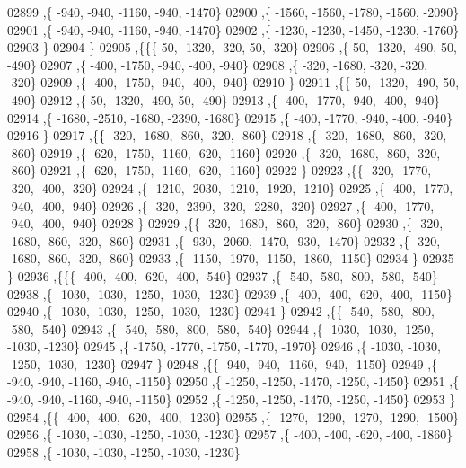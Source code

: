 \begin{DoxyCode}
02899     ,\{  -940,  -940, -1160,  -940, -1470\}
02900     ,\{ -1560, -1560, -1780, -1560, -2090\}
02901     ,\{  -940,  -940, -1160,  -940, -1470\}
02902     ,\{ -1230, -1230, -1450, -1230, -1760\}
02903     \}
02904    \}
02905   ,\{\{\{    50, -1320,  -320,    50,  -320\}
02906     ,\{    50, -1320,  -490,    50,  -490\}
02907     ,\{  -400, -1750,  -940,  -400,  -940\}
02908     ,\{  -320, -1680,  -320,  -320,  -320\}
02909     ,\{  -400, -1750,  -940,  -400,  -940\}
02910     \}
02911    ,\{\{    50, -1320,  -490,    50,  -490\}
02912     ,\{    50, -1320,  -490,    50,  -490\}
02913     ,\{  -400, -1770,  -940,  -400,  -940\}
02914     ,\{ -1680, -2510, -1680, -2390, -1680\}
02915     ,\{  -400, -1770,  -940,  -400,  -940\}
02916     \}
02917    ,\{\{  -320, -1680,  -860,  -320,  -860\}
02918     ,\{  -320, -1680,  -860,  -320,  -860\}
02919     ,\{  -620, -1750, -1160,  -620, -1160\}
02920     ,\{  -320, -1680,  -860,  -320,  -860\}
02921     ,\{  -620, -1750, -1160,  -620, -1160\}
02922     \}
02923    ,\{\{  -320, -1770,  -320,  -400,  -320\}
02924     ,\{ -1210, -2030, -1210, -1920, -1210\}
02925     ,\{  -400, -1770,  -940,  -400,  -940\}
02926     ,\{  -320, -2390,  -320, -2280,  -320\}
02927     ,\{  -400, -1770,  -940,  -400,  -940\}
02928     \}
02929    ,\{\{  -320, -1680,  -860,  -320,  -860\}
02930     ,\{  -320, -1680,  -860,  -320,  -860\}
02931     ,\{  -930, -2060, -1470,  -930, -1470\}
02932     ,\{  -320, -1680,  -860,  -320,  -860\}
02933     ,\{ -1150, -1970, -1150, -1860, -1150\}
02934     \}
02935    \}
02936   ,\{\{\{  -400,  -400,  -620,  -400,  -540\}
02937     ,\{  -540,  -580,  -800,  -580,  -540\}
02938     ,\{ -1030, -1030, -1250, -1030, -1230\}
02939     ,\{  -400,  -400,  -620,  -400, -1150\}
02940     ,\{ -1030, -1030, -1250, -1030, -1230\}
02941     \}
02942    ,\{\{  -540,  -580,  -800,  -580,  -540\}
02943     ,\{  -540,  -580,  -800,  -580,  -540\}
02944     ,\{ -1030, -1030, -1250, -1030, -1230\}
02945     ,\{ -1750, -1770, -1750, -1770, -1970\}
02946     ,\{ -1030, -1030, -1250, -1030, -1230\}
02947     \}
02948    ,\{\{  -940,  -940, -1160,  -940, -1150\}
02949     ,\{  -940,  -940, -1160,  -940, -1150\}
02950     ,\{ -1250, -1250, -1470, -1250, -1450\}
02951     ,\{  -940,  -940, -1160,  -940, -1150\}
02952     ,\{ -1250, -1250, -1470, -1250, -1450\}
02953     \}
02954    ,\{\{  -400,  -400,  -620,  -400, -1230\}
02955     ,\{ -1270, -1290, -1270, -1290, -1500\}
02956     ,\{ -1030, -1030, -1250, -1030, -1230\}
02957     ,\{  -400,  -400,  -620,  -400, -1860\}
02958     ,\{ -1030, -1030, -1250, -1030, -1230\}

\end{DoxyCode}
